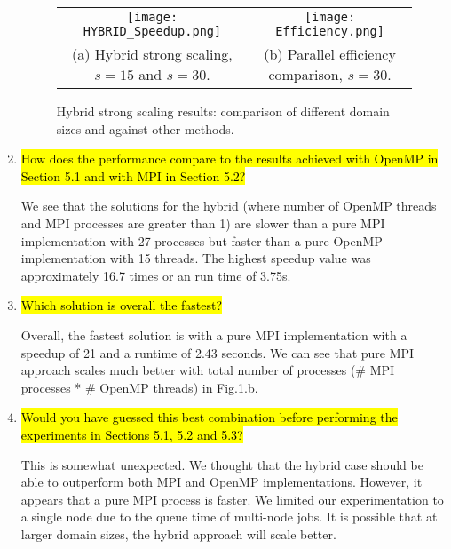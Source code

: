 \documentclass{article}
\begin{document}
\begin{enumerate}
	\begin{figure}[p] %
		\hspace*{-0.25\linewidth}\begin{tabular}{cc}
			\texttt{[image: HYBRID\_Speedup.png]} & \texttt{[image: Efficiency.png]}\\
			(a) Hybrid strong scaling, $s=15$ and $s=30$. & (b) Parallel efficiency comparison, $s=30$.
		\end{tabular}
		\label{fig:hybrid}
		\caption{Hybrid strong scaling results: comparison of different domain sizes and against other methods.}
	\end{figure}
	
	\item \hl{How does the performance compare to the results achieved with OpenMP in Section 5.1 and with MPI in Section 5.2?}

	We see that the solutions for the hybrid (where number of OpenMP threads and MPI processes are greater than 1) are slower than a pure MPI implementation with 27 processes but faster than a pure OpenMP implementation with 15 threads. The highest speedup value was approximately 16.7 times or an run time of 3.75s. 
	
	\item \hl{Which solution is overall the fastest?}

	Overall, the fastest solution is with a pure MPI implementation with a speedup of 21 and a runtime of 2.43 seconds. We can see that pure MPI approach scales much better with total number of processes (\# MPI processes * \# OpenMP threads) in Fig.\ref{fig:hybrid}.b.
	
	\item \hl{Would you have guessed this best combination before performing the experiments in Sections 5.1, 5.2 and 5.3?}

	This is somewhat unexpected. We thought that the hybrid case should be able to outperform both MPI and OpenMP implementations. However, it appears that a pure MPI process is faster. We limited our experimentation to a single node due to the queue time of multi-node jobs. It is possible that at larger domain sizes, the hybrid approach will scale better.
\end{enumerate}
\end{document}
